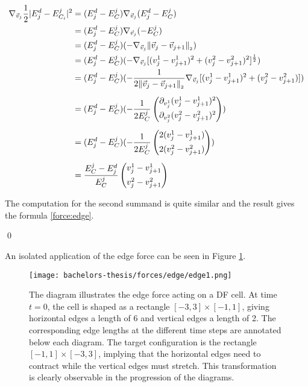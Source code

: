 \begin{proposition}
	\begin{align*}
		\nabla_{\vec{v}_{j}} \frac{1}{2} | E_{j}^d - E^j_{C_i}|^2 &= (E_j^d - E^j_C) \nabla_{\vec{v}_j} (E_j^d - E^j_C) \\
		&= (E_j^d - E^j_C) \nabla_{\vec{v}_j} ( - E^j_C) \\
		&= (E_j^d - E^j_C) (- \nabla_{\vec{v}_j} \norm[\vec{v}_j - \vec{v}_{j+1}] ) \\
		&= (E_j^d - E^j_C) (- \nabla_{\vec{v}_j} [(v_j^1 - v_{j+1}^1)^2 + (v_j^2 - v_{j+1}^2)^2]^{\frac{1}{2}} ) \\
		&= (E_j^d - E^j_C) (- \frac{1}{2 \norm[\vec{v}_j - \vec{v}_{j+1}]} \nabla_{\vec{v}_j} [(v_j^1 - v_{j+1}^1)^2 + (v_j^2 - v_{j+1}^2)]) \\[0.5em] 
		&= (E_j^d - E^j_C) (- \frac{1}{2 E^j_C} \begin{pmatrix}
			\partial_{v_j^1} (v_j^1 - v_{j+1}^1)^2 \\[0.5em]
			\partial_{v_j^2} (v_j^2 - v_{j+1}^2)^2
		\end{pmatrix}) \\[0.5em]
		&= (E_j^d - E^j_C) (- \frac{1}{2 E^j_C} \begin{pmatrix}
			 2(v_j^1 - v_{j+1}^1) \\[0.5em]
			 2(v_j^2 - v_{j+1}^2)
		\end{pmatrix}) \\[0.5em] 
		&= \frac{E^j_C - E_j^d}{E^j_C} \begin{pmatrix}
			v_j^1 - v_{j+1}^1 \\[0.5em]
			v_j^2 - v_{j+1}^2
	   \end{pmatrix} 
	\end{align*}

	The computation for the second summand is quite similar and the result gives the formula \ref{force:edge}. 

	\qed  
\end{proposition}

An isolated application of the edge force can be seen in Figure \ref{fig:edgeForce}.  

\begin{figure}
	\begin{center}
		\texttt{[image: bachelors-thesis/forces/edge/edge1.png]}
		\caption{The diagram illustrates the edge force acting on a DF cell.
		At time $t=0$, the cell is shaped as a rectangle $[-3,3]\times [-1,1]$, giving horizontal edges a length of 6 and vertical edges a length of 2.
		The corresponding edge lengths at the different time steps are annotated below each diagram.
		The target configuration is the rectangle $[-1,1]\times [-3,3]$, implying that the horizontal edges need to contract while the vertical edges must stretch.
		This transformation is clearly observable in the progression of the diagrams.
		}
		\label{fig:edgeForce}
	\end{center}
\end{figure}


